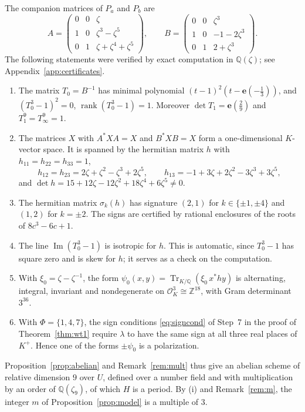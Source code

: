 \documentclass[11pt]{amsart}
\theoremstyle{definition}
\theoremstyle{remark}
\numberwithin{equation}{section}
\newcommand{\Q}{\mathbb{Q}}
\newcommand{\Z}{\mathbb{Z}}
\newcommand{\e}{\mathbf{e}}
\newcommand{\cO}{\mathcal{O}}
\DeclareMathOperator{\Tr}{Tr}
\DeclareMathOperator{\rank}{rank}
\DeclareMathOperator{\im}{Im}
\begin{document}
The companion matrices of $P_a$ and $P_b$ are
\[
A=\begin{pmatrix}0&0&\zeta\\1&0&\zeta^3-\zeta^5\\0&1&\zeta+\zeta^4+\zeta^5\end{pmatrix},\qquad
B=\begin{pmatrix}0&0&\zeta^3\\1&0&-1-2\zeta^3\\0&1&2+\zeta^3\end{pmatrix}.
\]
The following statements were verified by exact computation in $\Q(\zeta)$; see Appendix~\ref{app:certificates}.
\begin{enumerate}[label=(\roman*),leftmargin=2em]
\item The matrix $T_0=B^{-1}$ has minimal polynomial $(t-1)^2(t-\e(-\frac13))$, and $(T_0^3-1)^2=0$, $\rank(T_0^3-1)=1$. Moreover $\det T_1=\e(\frac29)$ and $T_1^9=T_\infty^9=1$.
\item The matrices $X$ with $A^*XA=X$ and $B^*XB=X$ form a one-dimensional $K$-vector space. It is spanned by the hermitian matrix $h$ with $h_{11}=h_{22}=h_{33}=1$,
\[
h_{12}=h_{23}=2\zeta+\zeta^2-\zeta^3+2\zeta^5,\qquad h_{13}=-1+3\zeta+2\zeta^2-3\zeta^3+3\zeta^5,
\]
and $\det h=15+12\zeta-12\zeta^2+18\zeta^4+6\zeta^5\ne0$.
\item The hermitian matrix $\sigma_k(h)$ has signature $(2,1)$ for $k\in\{\pm1,\pm4\}$ and $(1,2)$ for $k=\pm2$. The signs are certified by rational enclosures of the roots of $8c^3-6c+1$.
\item The line $\im(T_0^3-1)$ is isotropic for $h$. This is automatic, since $T_0^3-1$ has square zero and is skew for $h$; it serves as a check on the computation.
\item With $\xi_0=\zeta-\zeta^{-1}$, the form $\psi_0(x,y)=\Tr_{K/\Q}(\xi_0\,x^*hy)$ is alternating, integral, invariant and nondegenerate on $\cO_K^3\cong\Z^{18}$, with Gram determinant $3^{36}$.
\item With $\Phi=\{1,4,7\}$, the sign conditions \eqref{eq:signcond} of Step~7 in the proof of Theorem~\ref{thm:wt1} require $\lambda$ to have the same sign at all three real places of $K^+$. Hence one of the forms $\pm\psi_0$ is a polarization.
\end{enumerate}
Proposition~\ref{prop:abelian} and Remark~\ref{rem:mult} thus give an abelian scheme of relative dimension $9$ over $U$, defined over a number field and with multiplication by an order of $\Q(\zeta_9)$, of which $H$ is a period. By (i) and Remark~\ref{rem:m}, the integer $m$ of Proposition~\ref{prop:model} is a multiple of $3$.
\end{document}
